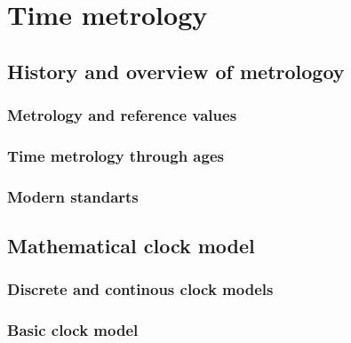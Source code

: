 \setchapterpreamble[u]{\margintoc}
\chapter[Time metrology]{Time metrology\footnotemark[0]}


\section{History and overview of metrologoy}

\subsection{Metrology and reference values}

\subsection{Time metrology through ages}

\subsection{Modern standarts}


\section{Mathematical clock model}

\subsection{Discrete and continous clock models}

\subsection{Basic clock model}

